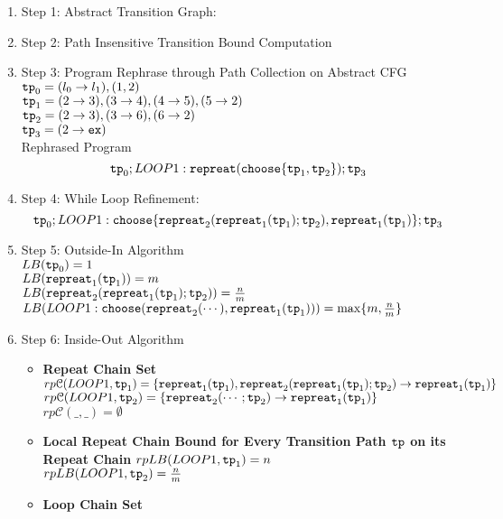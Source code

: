 \begin{enumerate}
  \item Step 1: Abstract Transition Graph:

\item Step 2: Path Insensitive Transition Bound Computation

\item Step 3: Program Rephrase through Path Collection on Abstract CFG
\\
$\mathtt{tp}_0 = (l_0 \to l_1), (1, 2)$
\\
$\mathtt{tp}_1 = (2 \to 3), (3 \to 4), (4 \to 5), (5 \to 2)$
\\
$\mathtt{tp}_2 = (2 \to 3), (3 \to 6), (6 \to 2)$
\\
$\mathtt{tp}_3 = (2 \to \mathtt{ex})$
\\
Rephrased Program
\[
\mathtt{tp}_0 ; LOOP1: \mathtt{repreat}(\mathtt{choose}\{\mathtt{tp}_1, \mathtt{tp}_2 \}); \mathtt{tp}_3
\]
\item Step 4: While Loop Refinement:
\[
  \mathtt{tp}_0 ; LOOP1: \mathtt{choose}\{\mathtt{repreat}_2(\mathtt{repreat}_1(\mathtt{tp}_1); \mathtt{tp}_2) , \mathtt{repreat}_1(\mathtt{tp}_1) \}; \mathtt{tp}_3
  \]
\item Step 5: Outside-In Algorithm
\\
$LB(\mathtt{tp}_0) = 1$
\\
$LB(\mathtt{repreat}_1(\mathtt{tp}_1)) = m $
\\
$LB(\mathtt{repreat}_2(\mathtt{repreat}_1(\mathtt{tp}_1); \mathtt{tp}_2)) = \frac{n}{m} $
\\
$LB(LOOP1: \mathtt{choose}(\mathtt{repreat}_2(\cdots), \mathtt{repreat}_1(\mathtt{tp}_1))) 
= \max\{m, \frac{n}{m}\} $
\\
\item Step 6: Inside-Out Algorithm
\begin{itemize}
  \item \textbf{Repeat Chain Set}
  \\
  $rp\mathcal{C}(LOOP1, \mathtt{tp}_1) = \{\mathtt{repreat}_1(\mathtt{tp}_1), \mathtt{repreat}_2(\mathtt{repreat}_1(\mathtt{tp}_1); \mathtt{tp}_2) \to \mathtt{repreat}_1(\mathtt{tp}_1)\}$ \\
  $rp\mathcal{C}(LOOP1, \mathtt{tp}_2) = \{\mathtt{repreat}_2(\cdots; \mathtt{tp}_2) \to \mathtt{repreat}_1(\mathtt{tp}_1)\}$ \\
  $rp\mathcal{C}(\_, \_) = \emptyset$ 
  \item \textbf{{Local Repeat Chain Bound} for Every Transition Path $\mathtt{tp}$ on its Repeat Chain}
  $rpLB(LOOP1, \mathtt{tp}_1) = n$ \\
  $rpLB(LOOP1, \mathtt{tp}_2) = \frac{n}{m}$ 
  \item \textbf{Loop Chain Set}
  \\

\end{itemize}
\end{enumerate}
